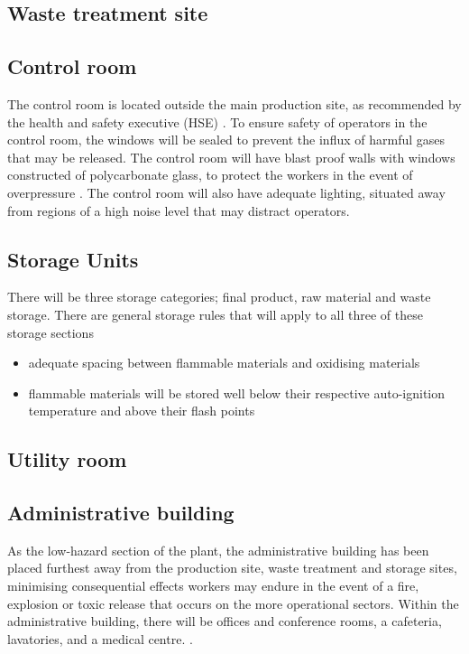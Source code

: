 \subsection{Waste treatment site}





\subsection{Control room}

The control room is located outside the main production site, as recommended by the health and safety executive (HSE) \cite{health_and_safety_executive_control_nodate}. To ensure safety of operators in the control room, the windows will be sealed to prevent the influx of harmful gases that may be released. The control room will have blast proof walls with windows constructed of polycarbonate glass, to protect the workers in the event of overpressure \cite{health_and_safety_executive_control_nodate}. The control room will also have adequate lighting, situated away from regions of a high noise level that may distract operators. 

\subsection{Storage Units}

There will be three storage categories; final product, raw material and waste storage. There are general storage rules that will apply to all three of these storage sections 

\begin{itemize}
    \item adequate spacing between flammable materials and oxidising materials 
    \item flammable materials will be stored well below their respective auto-ignition temperature and above their flash points
\end{itemize}


\subsection{Utility room}


\subsection{Administrative building}

As the low-hazard section of the plant, the administrative building has been placed furthest away from the production site, waste treatment and storage sites, minimising  consequential effects workers may endure in the event of a fire, explosion or toxic release that occurs on the more operational sectors. Within the administrative building, there will be offices and conference rooms, a cafeteria, lavatories, and a medical centre. \cite{sinnott_coulson_2005}. 